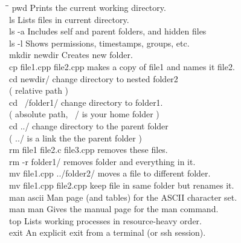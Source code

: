 \documentclass[letterpaper,10pt,titlepage,fleqn]{article}
\begin{document}
\begin{tabbing}
\hspace*{2cm}\=\hspace*{3cm}\= \kill
pwd									\>\>Prints the current working directory.\\
ls									\>\>Lists files in current directory.\\
ls -a								\>\>Includes self and parent folders, and hidden files\\
ls -l								\>\>Shows permissions, timestamps, groups, etc.\\
mkdir newdir						\>\>Creates new folder.\\
cp file1.cpp file2.cpp				\>\>makes a copy of file1 and names it file2.\\
cd newdir/							\>\>change directory to nested folder2\\
									\>\>( relative path )\\
cd ~/folder1/						\>\>change directory to folder1.\\
									\>\>( absolute path, ~/ is your home folder )\\
cd ../								\>\>change directory to the parent folder\\
									\>\>( ../ is a link the the parent folder )\\
rm file1 file2.c file3.cpp			\>\>removes these files.\\
rm -r folder1/						\>\>removes folder and everything in it.\\
mv file1.cpp ../folder2/			\>\>moves a file to different folder.\\
mv file1.cpp file2.cpp				\>\>keep file in same folder but renames it.\\
man ascii							\>\>Man page (and tables) for the ASCII character set.\\
man man								\>\>Gives the manual page for the man command.\\
top									\>\>Lists working processes in resource-heavy order.\\
exit								\>\>An explicit exit from a terminal (or ssh
session). \\
\end{tabbing}
\end{document}
